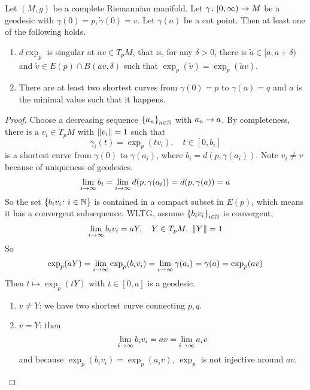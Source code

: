 \begin{thm}\label{thm:cutpoint}
	Let $(M,g)$ be a complete Riemannian manifold. Let $\gamma \colon [0,\infty) \rightarrow M$ be a geodesic with $\gamma(0)=p,\dot{\gamma}(0)=v$. Let $\gamma(a)$ be a cut point. Then at least one of the following holds.
	\begin{enumerate}[label=(\arabic{*})]
		\item $d\exp_p$ is singular at $av \in T_pM$, that is, for any $\delta > 0$, there is $\tilde{a} \in [a,a+\delta)$ and $\tilde{v} \in E(p) \cap B(av,\delta)$ such that $\exp_p(\tilde{v}) = \exp_p(\tilde{a}v)$.
		\item There are at least two shortest curves from $\gamma(0)=p$ to $\gamma(a)=q$ and $a$ is the minimal value such that it happens.
	\end{enumerate}
\end{thm}
\begin{proof}
	Choose a decreasing sequence $\left\{a_n\right\}_{n \in \mathbb{N}}$ with $a_n \rightarrow a$. By completeness, there is a $v_i \in T_pM$ with $\left\lVert v_i\right\lVert=1$ such that
	\begin{equation*}
		\gamma_i(t) = \exp_p(tv_i),\quad t \in [0,b_i]
	\end{equation*}
	is a shortest curve from $\gamma(0)$ to $\gamma(a_i)$, where $b_i = d(p,\gamma(a_i))$. Note $v_i \neq v$ because of uniqueness of geodesics. 
	\begin{equation*}
		\lim_{i \rightarrow \infty} b_i = \lim_{i \rightarrow \infty} d(p,\gamma(a_i)) = d(p,\gamma(a)) = a
	\end{equation*}
	So the set $\left\{b_iv_i \colon i\in\mathbb{N}\right\}$ is contained in a compact subset in $E(p)$, which means it has a convergent subsequence. WLTG, assume $\left\{b_iv_i\right\}_{i\in\mathbb{N}}$ is convergent,
	\begin{equation*}
		\lim_{i \rightarrow \infty} b_iv_i = aY,\quad Y \in T_pM,~\left\lVert Y\right\lVert=1
	\end{equation*}
	So
	\begin{equation*}
		\exp_p(aY) = \lim_{i \rightarrow \infty} \exp_p(b_iv_i) = \lim_{i \rightarrow \infty} \gamma(a_i) = \gamma(a) = \exp_p(av)
	\end{equation*}
	Then $t \mapsto \exp_p(tY)$ with $t \in [0,a]$ is a geodesic.
	\begin{enumerate}[label=(\arabic{*})]
		\item $v \neq Y$: we have two shortest curve connecting $p,q$.
		\item $v = Y$: then
		\begin{equation*}
			\lim_{i \rightarrow \infty} b_iv_i = av = \lim_{i\rightarrow \infty} a_iv
		\end{equation*}
		and because $\exp_p(b_iv_i) = \exp_p(a_iv)$, $\exp_p$ is not injective around $av$. \qedhere
	\end{enumerate}
\end{proof}

